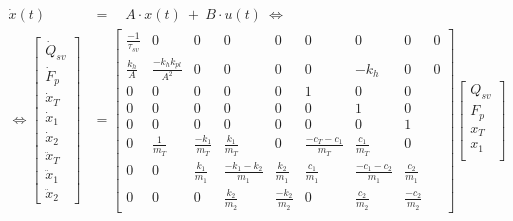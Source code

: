 \documentclass[9pt]{extarticle}
\begin{document}
\begin{align}
    \dot{x}(t) \enspace &=  \quad A \cdot x(t) \ + \ B \cdot u(t) \ \Longleftrightarrow \nonumber \\
    \Longleftrightarrow 
    \begin{bmatrix} 
        \dot{Q}_{sv} \\[6pt]
        \dot{F}_p \\[6pt]
        \dot{x}_T \\[6pt]
        \dot{x}_1 \\[6pt]
        \dot{x}_2 \\[6pt]
        \ddot{x}_T \\[6pt]
        \ddot{x}_1 \\[6pt]
        \ddot{x}_2 
    \end{bmatrix} &=
    \begin{bmatrix}
    \frac{-1}{\tau_{sv}} &  0 & 0 & 0 & 0 & 0 & 0 & 0 & 0\\[6pt]
    \frac{k_h}{A}  & \frac{- k_h k_{pl}}{A^2} & 0              & 0 & 0                & 0   & -k_h & 0               & 0 \\[6pt]
                    0 &               0              & 0 & 0                & 0   & 1    & 0               & 0 \\[6pt]
                    0 &               0              & 0 & 0                & 0   & 0    & 1               & 0 \\[6pt]
                    0 &               0              & 0 & 0                & 0   & 0    & 0               & 1 \\[6pt]
                    0 &                \frac{1}{m_T} & \frac{-k_1}{m_T} & \frac{k_1}{m_T}     &  0              & \frac{-c_T - c_1 }{m_T} & \frac{ c_1 }{m_T}   & 0               \\[6pt]
                    0 &                0             & \frac{k_1}{m_1}  &\frac{-k_1-k_2}{m_1} & \frac{k_2}{m_1} & \frac{c_1}{m_1}         &\frac{-c_1-c_2}{m_1} & \frac{c_2}{m_1} \\[6pt]
                    0 &                0             &         0        & \frac{k_2}{m_2}     & \frac{-k_2}{m_2}& 0                       & \frac{c_2}{m_2}     & \frac{-c_2}{m_2}
    \end{bmatrix}             
    \begin{bmatrix}
        Q_{sv} \\[6pt]
        F_p \\[6pt]
        x_T \\[6pt]
        x_1 \\[6pt]

\end{bmatrix}
\end{align}
\end{document}
